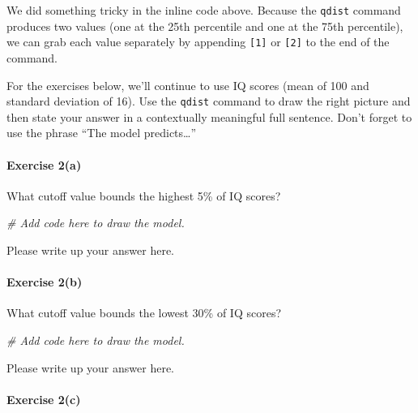 \documentclass[
]{book}
\newenvironment{Shaded}{\begin{snugshade}}{\end{snugshade}}
\newcommand{\CommentTok}[1]{\textcolor[rgb]{0.56,0.35,0.01}{\textit{#1}}}
\begin{document}
We did something tricky in the inline code above. Because the \texttt{qdist} command produces two values (one at the 25th percentile and one at the 75th percentile), we can grab each value separately by appending \texttt{{[}1{]}} or \texttt{{[}2{]}} to the end of the command.

For the exercises below, we'll continue to use IQ scores (mean of 100 and standard deviation of 16). Use the \texttt{qdist} command to draw the right picture and then state your answer in a contextually meaningful full sentence. Don't forget to use the phrase ``The model predicts\ldots{}''

\hypertarget{exercise-2a-2}{%
\paragraph*{Exercise 2(a)}\label{exercise-2a-2}}

What cutoff value bounds the highest 5\% of IQ scores?

\begin{Shaded}
\begin{Highlighting}[]
\CommentTok{\# Add code here to draw the model.}
\end{Highlighting}
\end{Shaded}

Please write up your answer here.

\hypertarget{exercise-2b-2}{%
\paragraph*{Exercise 2(b)}\label{exercise-2b-2}}

What cutoff value bounds the lowest 30\% of IQ scores?

\begin{Shaded}
\begin{Highlighting}[]
\CommentTok{\# Add code here to draw the model.}
\end{Highlighting}
\end{Shaded}

Please write up your answer here.

\hypertarget{exercise-2c-2}{%
\paragraph*{Exercise 2(c)}\label{exercise-2c-2}}
\end{document}
